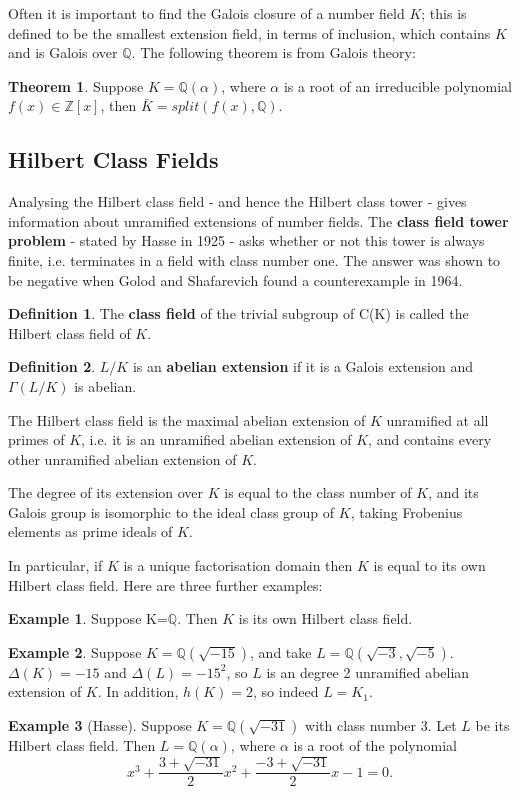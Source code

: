 \documentclass[12pt]{extarticle}
\newcommand{\Q}{\mathbb{Q}}
\newcommand{\Z}{\mathbb{Z}}
\newcommand{\spl}{split(f(x),\mathbb{Q})}
\newcommand{\<}{\langle}
\renewcommand{\>}{\rangle}
\theoremstyle{definition}
\newtheorem{theorem}{Theorem}
\newtheorem*{definition}{Definition}
\newtheorem{example}{Example}
\begin{document}
Often it is important to find the Galois closure of a number field $K$; this is defined to be the smallest extension field, in terms of inclusion, which contains $K$ and is Galois over $\Q$. The following theorem is from Galois theory:
 \begin{theorem}
  Suppose $K=\Q(\alpha)$, where $\alpha$ is a root of an irreducible polynomial $f(x) \in \Z[x]$, then $\bar{K} = \spl$.
\end{theorem}


\subsection{Hilbert Class Fields}
Analysing the Hilbert class field - and hence the Hilbert class tower - gives information about unramified extensions of number fields. The \textbf{class
field tower problem} - stated by Hasse in 1925 - asks whether or not this tower is always finite, i.e. terminates in a field with class number one. The answer was shown to be negative when
Golod and Shafarevich found a counterexample in 1964. 
\begin{definition}
The \textbf{class field} of the trivial subgroup of C(K) is called the Hilbert class field of $K$. 
\end{definition}
\begin{definition}
$L/K$ is an \textbf{abelian extension} if it is a Galois extension and $\Gamma(L/K)$ is abelian. 
\end{definition}
The Hilbert class field is the maximal abelian extension of $K$ unramified at all primes of $K$, i.e. it is an unramified abelian extension of $K$, and contains every other unramified abelian extension of $K$. \par
The degree of its extension over $K$ is equal to the class number of $K$, and its Galois group is isomorphic to the ideal class group of $K$, taking Frobenius elements as prime ideals of $K$. \par
In particular, if $K$ is a unique factorisation domain then $K$ is equal to its own Hilbert class field. 
Here are three further examples:
\begin{example}
    Suppose K=$\Q$. Then $K$ is its own Hilbert class field.
    \label{ex:q_is_ufd} 
\end{example}
\begin{example}
    Suppose $K=\Q\left(\sqrt{-15}\right)$, and take $L=\Q\left(\sqrt{-3},\sqrt{-5}\right)$. $\Delta(K) = -15$ and $\Delta(L) = -15^2$, so $L$ is an degree 2 unramified abelian extension of $K$. In addition, $h(K)=2$, so indeed $L=K_1$.  
\end{example}
\begin{example}[Hasse]
    Suppose $K=\Q\left(\sqrt{-31}\right)$ with class number 3. Let $L$ be its Hilbert class field. Then $L = \Q(\alpha)$, where $\alpha$ is a root of the polynomial 
    \begin{equation}
        x^3+\frac{3+\sqrt{-31}}{2}x^2+\frac{-3+\sqrt{-31}}{2}x -1 =0.
    \end{equation}
\end{example}
\end{document}
